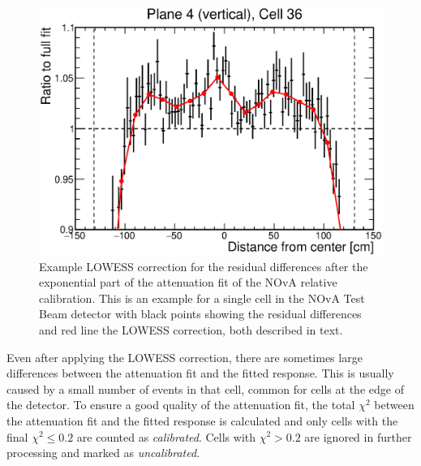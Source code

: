 \begin{figure}
    \centering
    \includegraphics[width=.7\textwidth]{Plots/NOvAExperiment/ExampleLOWESSFit.eps}
    \caption[Example LOWESS correction for NOvA relative calibration]{Example \acrshort{LOWESS} correction for the residual differences after the exponential part of the attenuation fit of the \acrshort{NOvA} relative calibration. This is an example for a single cell in the \acrshort{NOvA} Test Beam detector with black points showing the residual differences and red line the \acrshort{LOWESS} correction, both described in text.}
    \label{fig:NOvACalibrationLOWESSCorrection}
\end{figure}

Even after applying the \gls{LOWESS} correction, there are sometimes large differences between the attenuation fit and the fitted response. This is usually caused by a small number of events in that cell, common for cells at the edge of the detector. To ensure a good quality of the attenuation fit, the total $\chi^2$ between the attenuation fit and the fitted response is calculated and only cells with the final $\chi^2\leq 0.2$ are counted as \textit{calibrated}. Cells with $\chi^2>0.2$ are ignored in further processing and marked as \textit{uncalibrated}.


